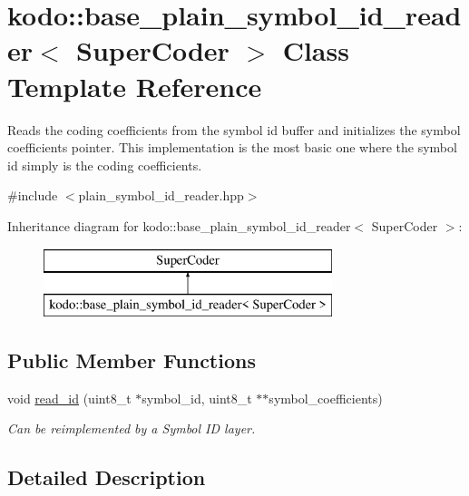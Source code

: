 \hypertarget{classkodo_1_1base__plain__symbol__id__reader}{\section{kodo\-:\-:base\-\_\-plain\-\_\-symbol\-\_\-id\-\_\-reader$<$ Super\-Coder $>$ Class Template Reference}
\label{classkodo_1_1base__plain__symbol__id__reader}
}


Reads the coding coefficients from the symbol id buffer and initializes the symbol coefficients pointer. This implementation is the most basic one where the symbol id simply is the coding coefficients.  




{\ttfamily \#include $<$plain\-\_\-symbol\-\_\-id\-\_\-reader.\-hpp$>$}

Inheritance diagram for kodo\-:\-:base\-\_\-plain\-\_\-symbol\-\_\-id\-\_\-reader$<$ Super\-Coder $>$\-:\begin{figure}[H]
\begin{center}
\leavevmode
\includegraphics[height=2.000000cm]{classkodo_1_1base__plain__symbol__id__reader}
\end{center}
\end{figure}
\subsection*{Public Member Functions}
\begin{DoxyCompactItemize}
\item 
void \hyperlink{classkodo_1_1base__plain__symbol__id__reader_a2d8c47b2854ccf9d616700469e03a569}{read\-\_\-id} (uint8\-\_\-t $\ast$symbol\-\_\-id, uint8\-\_\-t $\ast$$\ast$symbol\-\_\-coefficients)
\begin{DoxyCompactList}\small\item\em Can be reimplemented by a Symbol I\-D layer. \end{DoxyCompactList}\end{DoxyCompactItemize}


\subsection{Detailed Description}
